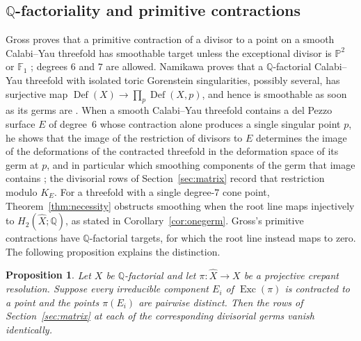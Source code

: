 \documentclass[11pt]{amsart}
\newtheorem{proposition}[theorem]{Proposition}
\theoremstyle{definition}
\theoremstyle{remark}
\theoremstyle{plain}
\newcommand{\QQ}{\mathbb{Q}}
\newcommand{\PP}{\mathbb{P}}
\newcommand{\Def}{\operatorname{Def}}
\newcommand{\Xh}{\widehat{X}}
\begin{document}
\subsection{\texorpdfstring{$\QQ$}{Q}-factoriality and primitive contractions}
\label{sec:qfact}

Gross proves that a primitive contraction of a divisor
to a point on a smooth Calabi--Yau threefold has smoothable target unless
the exceptional divisor is
$\PP^2$ or $\mathbb F_1$ \cite[Theorem~5.8]{Gross97}; degrees $6$ and
$7$ are allowed.  Namikawa proves that a $\QQ$-factorial
Calabi--Yau threefold with isolated toric Gorenstein singularities, possibly
several, has surjective map $\Def(X)\to\prod_p\Def(X,p)$, and hence is smoothable as soon
as its germs are \cite[Corollary~6]{Namikawa97}.  When a smooth Calabi--Yau
threefold contains a del Pezzo surface $E$ of degree~$6$ whose contraction
alone produces a single singular point $p$, he shows that the image of the
restriction of divisors to $E$ determines the image of the deformations of
the contracted threefold in the deformation space of its germ at $p$, and in
particular which smoothing components of the germ that image contains
\cite[Theorem~10]{Namikawa97}; the divisorial rows of
Section~\ref{sec:matrix} record that restriction modulo $K_E$.  For a threefold with
a single degree-$7$ cone point,
Theorem~\ref{thm:necessity} obstructs smoothing when the root line maps
injectively to $H_2(\Xh;\QQ)$, as stated in
Corollary~\ref{cor:onegerm}.  Gross's primitive contractions have
$\QQ$-factorial targets, for which the root line instead maps to zero.
The following proposition explains the distinction.

\begin{proposition}\label{prop:qfact}
Let $X$ be $\QQ$-factorial and let $\pi\colon\Xh\to X$ be a projective
crepant resolution.  Suppose every irreducible component $E_i$ of
$\operatorname{Exc}(\pi)$ is contracted to a point and the points $\pi(E_i)$
are pairwise distinct.  Then the rows of Section~\ref{sec:matrix} at each of
the corresponding divisorial germs vanish identically.
\end{proposition}
\end{document}
